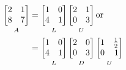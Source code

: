 \documentclass[../main.tex]{subfiles}
\begin{document}
\[
    \begin{aligned}
        \underbracket[0pt][0pt]{
            \begin{bmatrix*}[r]
                2 & 1 \\
                8 & 7
            \end{bmatrix*}
        }_{\mathstrut A}
         & =
        \underbracket[0pt][0pt]{
            \begin{bmatrix*}[r]
                1 & 0 \\
                4 & 1
            \end{bmatrix*}
        }_{\mathstrut L}
        \underbracket[0pt][0pt]{
            \begin{bmatrix*}[r]
                2 & 1 \\
                0 & 3
            \end{bmatrix*}
        }_{\mathstrut U}
        \text{or} \\
         &
        =
        \underbracket[0pt][0pt]{
            \begin{bmatrix*}[r]
                1 & 0 \\
                4 & 1
            \end{bmatrix*}
        }_{\mathstrut L}
        \underbracket[0pt][0pt]{
            \begin{bmatrix*}[r]
                2 & 0 \\
                0 & 3
            \end{bmatrix*}
        }_{\mathstrut D}
        \underbracket[0pt][0pt]{
            \begin{bmatrix*}[r]
                1 & \frac{1}{2} \\
                0 & 1
            \end{bmatrix*}
        }_{\mathstrut U}
    \end{aligned}
\]
\end{document}

